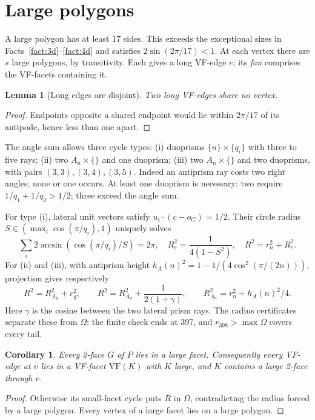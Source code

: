 \documentclass[11pt]{article}
\newtheorem{lemma}[theorem]{Lemma}
\newtheorem{corollary}[theorem]{Corollary}
\theoremstyle{definition}
\theoremstyle{remark}
\newcommand{\VF}{\mathrm{VF}}
\begin{document}
\section{Large polygons}\label{sec:caseB}
A large polygon has at least 17 sides. This exceeds the exceptional sizes
in Facts~\ref{fact:3d}--\ref{fact:4d} and satisfies $2\sin(2\pi/17)<1$.
At each vertex there are $s$ large polygons, by transitivity.
Each gives a long VF-edge $e$; its \emph{fan} comprises the VF-facets containing it.

\begin{lemma}[Long edges are disjoint]\label{lem:long}
Two long VF-edges share no vertex.
\end{lemma}
\begin{proof}
Endpoints opposite a shared endpoint would lie within $2\pi/17$ of
its antipode, hence less than one apart.
\end{proof}

The angle sum allows three cycle types:
(i) duoprisms $\{n\}\times\{q_i\}$ with three to five rays;
(ii) two $A_n\times\{\}$ and one duoprism;
(iii) two $A_n\times\{\}$ and two duoprisms, with pairs
$(3,3),(3,4),(3,5)$.
Indeed an antiprism ray costs two right angles; none or one occurs.
At least one duoprism is necessary; two require
$1/q_1+1/q_2>1/2$; three exceed the angle sum.

For type (i), lateral unit vectors satisfy $u_i\cdot(c-o_G)=1/2$.
Their circle radius $S\in(\max_i\cos(\pi/q_i),1)$ uniquely solves
\[
 \sum_i2\arcsin(\cos(\pi/q_i)/S)=2\pi,\quad
 R_c^2=\frac1{4(1-S^2)},\quad R^2=r_n^2+R_c^2.
\]
For (ii) and (iii), with antiprism height
$h_A(n)^2=1-1/(4\cos^2(\pi/(2n)))$, projection gives respectively
\[
 R^2=R_{A_n}^2+r_q^2,\qquad
 R^2=R_{A_n}^2+\frac1{2(1+\gamma)},\qquad R_{A_n}^2=r_n^2+h_A(n)^2/4.
\]
Here $\gamma$ is the cosine between the two lateral prism rays.
The radius certificates separate these from $\Omega$:
the finite check ends at 397, and $r_{398}>\max\Omega$ covers every tail.

\begin{corollary}\label{cor:B2}
Every 2-face $G$ of $P$ lies in a large facet. Consequently every VF-edge
at $v$ lies in a VF-facet $\VF(K)$ with $K$ large, and $K$ contains a large
2-face through $v$.
\end{corollary}
\begin{proof}
Otherwise its small-facet cycle puts $R$ in $\Omega$, contradicting
the radius forced by a large polygon. Every vertex of a large facet
lies on a large polygon.
\end{proof}
\end{document}
